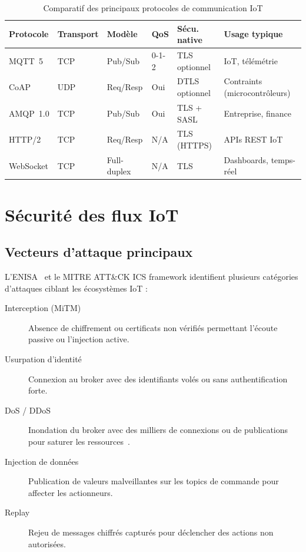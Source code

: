 \begin{table}[H]
\centering
\caption{Comparatif des principaux protocoles de communication IoT}
\label{tab:protocoles_iot}
\begin{tabular}{lllllp{3.5cm}}
\toprule
\textbf{Protocole} & \textbf{Transport} & \textbf{Modèle} & \textbf{QoS} & \textbf{Sécu. native} & \textbf{Usage typique} \\
\midrule
MQTT~5 & TCP & Pub/Sub & 0-1-2 & TLS optionnel & IoT, télémétrie \\
CoAP & UDP & Req/Resp & Oui & DTLS optionnel & Contraints (microcontrôleurs) \\
AMQP~1.0 & TCP & Pub/Sub & Oui & TLS + SASL & Entreprise, finance \\
HTTP/2 & TCP & Req/Resp & N/A & TLS (HTTPS) & APIs REST IoT \\
WebSocket & TCP & Full-duplex & N/A & TLS & Dashboards, temps-réel \\
\bottomrule
\end{tabular}
\end{table}

\section{Sécurité des flux IoT}

\subsection{Vecteurs d'attaque principaux}

L'ENISA~\cite{enisa_iot} et le MITRE ATT\&CK ICS framework identifient plusieurs catégories d'attaques ciblant les écosystèmes IoT :

\begin{description}
  \item[Interception (MiTM)] Absence de chiffrement ou certificats non vérifiés permettant l'écoute passive ou l'injection active.
  \item[Usurpation d'identité] Connexion au broker avec des identifiants volés ou sans authentification forte.
  \item[DoS / DDoS] Inondation du broker avec des milliers de connexions ou de publications pour saturer les ressources~\cite{kolias2017mirai}.
  \item[Injection de données] Publication de valeurs malveillantes sur les topics de commande pour affecter les actionneurs.
  \item[Replay] Rejeu de messages chiffrés capturés pour déclencher des actions non autorisées.
\end{description}

